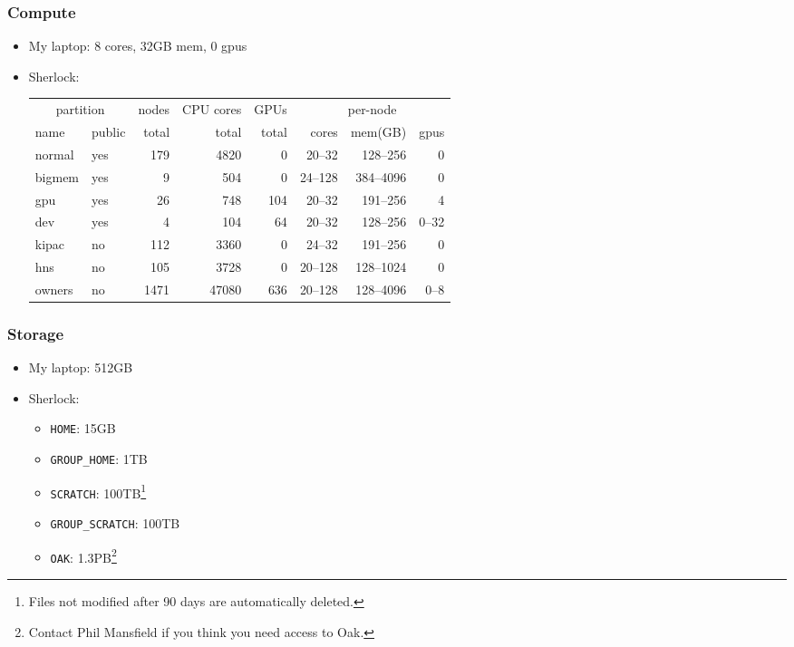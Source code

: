 \documentclass[aspectratio=169]{beamer}
\begin{document}
\begin{frame}
	\frametitle{Compute}
	\begin{itemize}
		\item My laptop: 8 cores, 32GB mem, 0 gpus
		\item Sherlock:
			\begin{center}
				\begin{tabular}{|l|l||r|r|r||r|r|r|}
					\hline
					\multicolumn{2}{|c||}{partition} & nodes & CPU cores & GPUs & \multicolumn{3}{|c|}{per-node} \\
					 name      &  public & total &     total & total &  cores &  mem(GB) & gpus \\
					\hline
					 normal   &  yes    &   179 &      4820 &     0 &  20--32 &  128--256 &    0 \\
					 bigmem    &  yes    &     9 &       504 &     0 & 24--128 & 384--4096 &    0 \\
					 gpu       &  yes    &    26 &       748 &   104 &  20--32 &  191--256 &    4 \\
					 dev       &  yes    &     4 &       104 &    64 &  20--32 &  128--256 & 0--32 \\
					\hline
					 kipac     &  no     &   112 &      3360 &     0 &  24--32 &  191--256 &    0 \\
					 hns       &  no     &   105 &      3728 &     0 & 20--128 & 128--1024 &    0 \\
					\hline
					 owners    &  no     &  1471 &     47080 &   636 & 20--128 & 128--4096 &  0--8 \\
					\hline
				\end{tabular}
			\end{center}
	\end{itemize}
\end{frame}

\begin{frame}
	\frametitle{Storage}
	\begin{itemize}
		\item My laptop: 512GB
		\item Sherlock:
			\begin{itemize}
				\item \texttt{HOME}: 15GB
				\item \texttt{GROUP\_HOME}: 1TB
				\item \texttt{SCRATCH}: 100TB\footnote{Files not modified after 90 days are automatically deleted.}
				\item \texttt{GROUP\_SCRATCH}: 100TB\footnotemark[\value{footnote}]
				\item \texttt{OAK}: 1.3PB\footnote{Contact Phil Mansfield if you think you need access to Oak.}
			\end{itemize}
	\end{itemize}
\end{frame}
\end{document}
